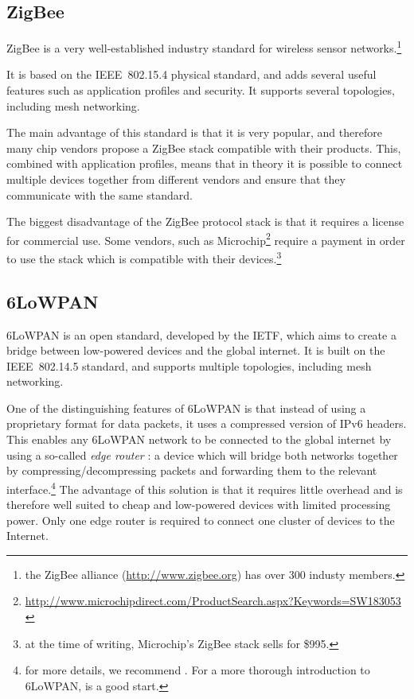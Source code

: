 \subsection{ZigBee}\label{sub:zigbee}

ZigBee is a very well-established industry standard for wireless sensor
networks.\footnote{the ZigBee alliance (\url{http://www.zigbee.org}) has over
300 industy members.}

It is based on the IEEE~802.15.4 physical standard, and adds several
useful features such as application profiles and security. It supports several
topologies, including mesh networking.

The main advantage of this standard is that it is very popular, and therefore
many chip vendors propose a ZigBee stack compatible with their products. This,
combined with application profiles, means that in theory it is possible to
connect multiple devices together from different vendors and ensure that they
communicate with the same standard.

The biggest disadvantage of the ZigBee protocol stack is that it requires
a license for commercial use. Some vendors, such as Microchip\footnote{\url{
http://www.microchipdirect.com/ProductSearch.aspx?Keywords=SW183053 }} require
a payment in order to use the stack which is compatible with their
devices.\footnote{at the time of writing, Microchip's ZigBee stack sells for
\$995.}

\subsection{6LoWPAN}\label{sub:6lowpan}

\ac{6LoWPAN} is an open standard, developed by the \ac{IETF}, which aims to create
a bridge between low-powered devices and the global internet. It is built on the
IEEE~802.14.5 standard, and supports multiple topologies, including mesh
networking. 

One of the distinguishing features of 6LoWPAN is that instead of using
a proprietary format for data packets, it uses a compressed version of IPv6
headers. This enables any 6LoWPAN network to be connected to the global internet
by using a so-called \emph{edge router} : a device which will bridge both
networks together by compressing/decompressing packets and forwarding them to
the relevant interface.\footnote{for more details, we recommend \citep[sec.
6.4]{shelby2010}. For a more thorough introduction to 6LoWPAN, \citep[chap.
16]{dunkels2010} is a good start.} The advantage of this solution is that it
   requires little overhead and is therefore well suited to cheap and
   low-powered devices with limited processing power. Only one edge router is
   required to connect one cluster of devices to the Internet.

